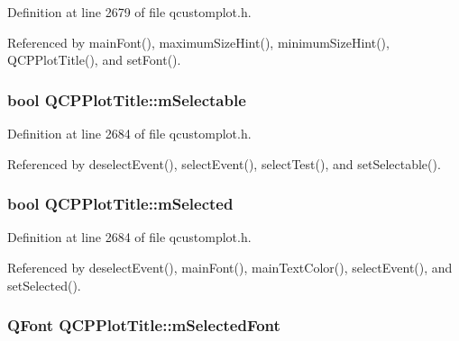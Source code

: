 Definition at line 2679 of file qcustomplot.\+h.



Referenced by main\+Font(), maximum\+Size\+Hint(), minimum\+Size\+Hint(), Q\+C\+P\+Plot\+Title(), and set\+Font().

\hypertarget{class_q_c_p_plot_title_aadefb5e2b19b1cc7deda0a55ec747884}{}
\subsubsection[{m\+Selectable}]{\setlength{\rightskip}{0pt plus 5cm}bool Q\+C\+P\+Plot\+Title\+::m\+Selectable\hspace{0.3cm}{\ttfamily [protected]}}\label{class_q_c_p_plot_title_aadefb5e2b19b1cc7deda0a55ec747884}


Definition at line 2684 of file qcustomplot.\+h.



Referenced by deselect\+Event(), select\+Event(), select\+Test(), and set\+Selectable().

\hypertarget{class_q_c_p_plot_title_afef1342a20f5ca985a20b9cfdc03d815}{}
\subsubsection[{m\+Selected}]{\setlength{\rightskip}{0pt plus 5cm}bool Q\+C\+P\+Plot\+Title\+::m\+Selected\hspace{0.3cm}{\ttfamily [protected]}}\label{class_q_c_p_plot_title_afef1342a20f5ca985a20b9cfdc03d815}


Definition at line 2684 of file qcustomplot.\+h.



Referenced by deselect\+Event(), main\+Font(), main\+Text\+Color(), select\+Event(), and set\+Selected().

\hypertarget{class_q_c_p_plot_title_a95003186c39bbab902873a8ef4cbb547}{}
\subsubsection[{m\+Selected\+Font}]{\setlength{\rightskip}{0pt plus 5cm}Q\+Font Q\+C\+P\+Plot\+Title\+::m\+Selected\+Font\hspace{0.3cm}{\ttfamily [protected]}}\label{class_q_c_p_plot_title_a95003186c39bbab902873a8ef4cbb547}


